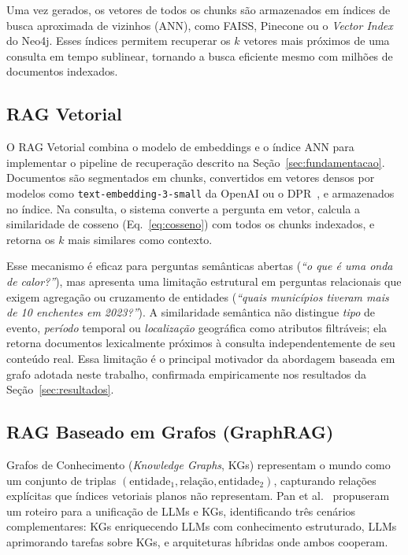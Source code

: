 \documentclass[conference]{IEEEtran}
\begin{document}
Uma vez gerados, os vetores de todos os chunks são armazenados
em índices de busca aproximada de vizinhos (ANN), como FAISS,
Pinecone ou o \textit{Vector Index} do Neo4j.
Esses índices permitem recuperar os $k$ vetores mais próximos
de uma consulta em tempo sublinear, tornando a busca eficiente
mesmo com milhões de documentos indexados.

\subsection{RAG Vetorial}

O RAG Vetorial combina o modelo de embeddings e o índice ANN
para implementar o pipeline de recuperação descrito na
Seção~\ref{sec:fundamentacao}.
Documentos são segmentados em chunks, convertidos em vetores
densos por modelos como \texttt{text-embedding-3-small} da
OpenAI ou o DPR~\cite{karpukhin2020dpr}, e armazenados no
índice.
Na consulta, o sistema converte a pergunta em vetor, calcula
a similaridade de cosseno (Eq.~\ref{eq:cosseno}) com todos os
chunks indexados, e retorna os $k$ mais similares como contexto.

Esse mecanismo é eficaz para perguntas semânticas abertas
(\emph{``o que é uma onda de calor?''}), mas apresenta uma
limitação estrutural em perguntas relacionais que exigem
agregação ou cruzamento de entidades
(\emph{``quais municípios tiveram mais de 10 enchentes em 2023?''}).
A similaridade semântica não distingue \emph{tipo} de evento,
\emph{período} temporal ou \emph{localização} geográfica como
atributos filtráveis; ela retorna documentos lexicalmente
próximos à consulta independentemente de seu conteúdo real.
Essa limitação é o principal motivador da abordagem baseada em
grafo adotada neste trabalho, confirmada empiricamente nos
resultados da Seção~\ref{sec:resultados}.

\subsection{RAG Baseado em Grafos (GraphRAG)}

Grafos de Conhecimento (\textit{Knowledge Graphs}, KGs)
representam o mundo como um conjunto de triplas
$(\text{entidade}_1, \text{relação}, \text{entidade}_2)$,
capturando relações explícitas que índices vetoriais planos
não representam.
Pan et al.~\cite{pan2024unifying} propuseram um roteiro para
a unificação de LLMs e KGs, identificando três cenários
complementares: KGs enriquecendo LLMs com conhecimento
estruturado, LLMs aprimorando tarefas sobre KGs, e
arquiteturas híbridas onde ambos cooperam.
\end{document}
